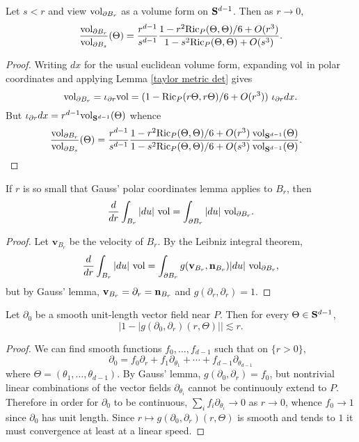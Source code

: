\begin{lemma}\label{rescale the sphere form}
Let $s < r$ and view $\mathrm{vol}_{\partial B_r}$ as a volume form on $\mathbf S^{d - 1}$.
Then as $r \to 0$,
$$\frac{\mathrm{vol}_{\partial B_r}}{\mathrm{vol}_{\partial B_s}}(\Theta) = \frac{r^{d - 1}}{s^{d - 1}} \frac{1 - r^2 \mathrm{Ric}_P(\Theta, \Theta)/6 + O(r^3)}{1 - s^2 \mathrm{Ric}_P(\Theta, \Theta) + O(s^3)}.$$
\end{lemma}
\begin{proof}
Writing $dx$ for the usual euclidean volume form, expanding $\mathrm{vol}$ in polar coordinates and applying Lemma \ref{taylor metric det} gives
$$\mathrm{vol}_{\partial B_r} = \iota_{\partial r} \mathrm{vol} = (1 - \mathrm{Ric}_P(r\Theta, r\Theta)/6 + O(r^3)) ~\iota_{\partial r} dx.$$
But $\iota_{\partial r} dx = r^{d - 1} \mathrm{vol}_{\mathbf S^{d - 1}}(\Theta)$ whence
\begin{align*}
\frac{\mathrm{vol}_{\partial B_r}}{\mathrm{vol}_{\partial B_s}}(\Theta) &= \frac{r^{d - 1}}{s^{d - 1}} \frac{1 - r^2 \mathrm{Ric}_P(\Theta, \Theta)/6 + O(r^3)}{1 - s^2 \mathrm{Ric}_P(\Theta, \Theta)/6 +
O(s^3)} \frac{\mathrm{vol}_{\mathbf S^{d - 1}}(\Theta)}{\mathrm{vol}_{\mathbf S^{d - 1}}(\Theta)}. \qedhere
\end{align*}
\end{proof}

\begin{lemma}\label{GaussLeibniz}
If $r$ is so small that Gauss' polar coordinates lemma applies to $B_r$, then
$$\frac{d}{dr} \int_{B_r} |du| ~\mathrm{vol} = \int_{\partial B_r} |du| ~\mathrm{vol}_{\partial B_r}.$$
\end{lemma}
\begin{proof}
Let $\mathbf v_{B_r}$ be the velocity of $B_r$.
By the Leibniz integral theorem,
$$\frac{d}{dr} \int_{B_r} |du| ~\mathrm{vol} = \int_{\partial B_r} g(\mathbf v_{B_r}, \mathbf n_{B_r}) |du| ~\mathrm{vol}_{\partial B_r},$$
but by Gauss' lemma, $\mathbf v_{B_r} = \partial_r = \mathbf n_{B_r}$ and $g(\partial_r, \partial_r) = 1$.
\end{proof}

\begin{lemma}\label{quasiradial}
Let $\partial_0$ be a smooth unit-length vector field near $P$. Then for every $\Theta \in \mathbf S^{d - 1}$,
\begin{equation}\label{quasiradial claim}
|1 - |g(\partial_0, \partial_r)(r, \Theta)|| \lesssim r.
\end{equation}
\end{lemma}
\begin{proof}
We can find smooth functions $f_0, \dots, f_{d - 1}$ such that on $\{r > 0\}$,
$$\partial_0 = f_0 \partial_r + f_1 \partial_{\theta_1} + \cdots + f_{d - 1} \partial_{\theta_{d - 1}}$$
where $\Theta = (\theta_1, \dots, \theta_{d - 1})$.
By Gauss' lemma, $g(\partial_0, \partial_r) = f_0$, but nontrivial linear combinations of the vector fields $\partial_{\theta_i}$ cannot be continuouly extend to $P$.
Therefore in order for $\partial_0$ to be continuous, $\sum_i f_i \partial_{\theta_i} \to 0$ as $r \to 0$, whence $f_0 \to 1$ since $\partial_0$ has unit length.
Since $r \mapsto g(\partial_0, \partial_r)(r, \Theta)$ is smooth and tends to $1$ it must convergence at least at a linear speed.
\end{proof}

